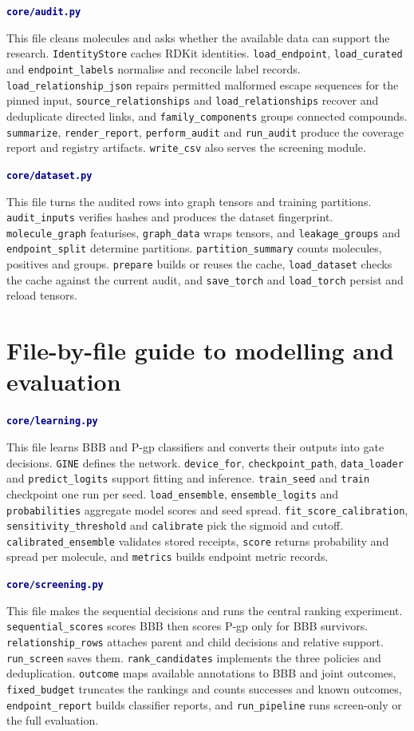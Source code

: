 \documentclass[11pt,a4paper]{article}
\newcommand{\code}[1]{\nolinkurl{#1}}
\newcommand{\lead}[1]{\par\smallskip\textbf{\textcolor{Navy}{#1}}\par\nobreak}
\newcommand{\pagehead}[1]{\clearpage\section{#1}}
\begin{document}
\lead{\code{core/audit.py}}
This file cleans molecules and asks whether the available data can support the research. \code{IdentityStore} caches RDKit identities. \code{load_endpoint}, \code{load_curated} and \code{endpoint_labels} normalise and reconcile label records. \code{load_relationship_json} repairs permitted malformed escape sequences for the pinned input, \code{source_relationships} and \code{load_relationships} recover and deduplicate directed links, and \code{family_components} groups connected compounds. \code{summarize}, \code{render_report}, \code{perform_audit} and \code{run_audit} produce the coverage report and registry artifacts. \code{write_csv} also serves the screening module.

\lead{\code{core/dataset.py}}
This file turns the audited rows into graph tensors and training partitions. \code{audit_inputs} verifies hashes and produces the dataset fingerprint. \code{molecule_graph} featurises, \code{graph_data} wraps tensors, and \code{leakage_groups} and \code{endpoint_split} determine partitions. \code{partition_summary} counts molecules, positives and groups. \code{prepare} builds or reuses the cache, \code{load_dataset} checks the cache against the current audit, and \code{save_torch} and \code{load_torch} persist and reload tensors.

\pagehead{File-by-file guide to modelling and evaluation}
\lead{\code{core/learning.py}}
This file learns BBB and P-gp classifiers and converts their outputs into gate decisions. \code{GINE} defines the network. \code{device_for}, \code{checkpoint_path}, \code{data_loader} and \code{predict_logits} support fitting and inference. \code{train_seed} and \code{train} checkpoint one run per seed. \code{load_ensemble}, \code{ensemble_logits} and \code{probabilities} aggregate model scores and seed spread. \code{fit_score_calibration}, \code{sensitivity_threshold} and \code{calibrate} pick the sigmoid and cutoff. \code{calibrated_ensemble} validates stored receipts, \code{score} returns probability and spread per molecule, and \code{metrics} builds endpoint metric records.

\lead{\code{core/screening.py}}
This file makes the sequential decisions and runs the central ranking experiment. \code{sequential_scores} scores BBB then scores P-gp only for BBB survivors. \code{relationship_rows} attaches parent and child decisions and relative support. \code{run_screen} saves them. \code{rank_candidates} implements the three policies and deduplication. \code{outcome} maps available annotations to BBB and joint outcomes, \code{fixed_budget} truncates the rankings and counts successes and known outcomes, \code{endpoint_report} builds classifier reports, and \code{run_pipeline} runs screen-only or the full evaluation.
\end{document}
